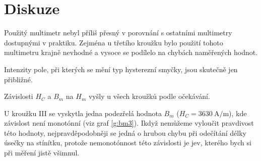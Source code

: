 \section*{Diskuze}
Použitý multimetr nebyl příliš přesný v porovnání s ostatními multimetry dostupnými v praktiku.
Zejména u třetího kroužku bylo použití tohoto multimetru krajně nevhodné a vysoce se podílelo na chybách naměřených hodnot.

Intenzity pole, při kterých se mění typ hysterezní smyčky, jsou skutečně jen přibližné.

Závislosti $H_C$ a $B_m$ na $H_m$ vyšly u všech kroužků podle očekávání.

U kroužku III se vyskytla jedna podezřelá hodnota $B_m$ ($H_C=\SI{3630}{\ampere\per\metre}$), kde závislost není monotónní (viz graf \ref{g:bm3}).
Ikdyž nemůžeme vyloučit pravdivost této hodnoty, nejpravděpodobněji se jedná o hrubou chybu při odečítání délky úsečky na stínítku, protože nemonotónnost této závislosti je jev, kterého bych si při měření jistě všimnul.